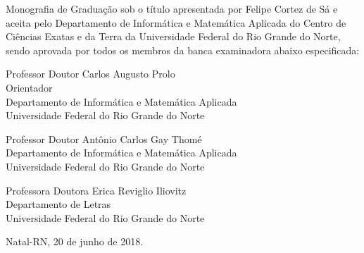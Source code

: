 \begin{folhadeaprovacao}
	\setlength{\ABNTsignthickness}{0.4pt}
	\setlength{\ABNTsignwidth}{10cm}
	
	\noindent 
	Monografia de Graduação sob o título \textit{\tccTitle} apresentada por 
	Felipe Cortez de Sá e aceita pelo Departamento de Informática e Matemática Aplicada do
	Centro de Ciências Exatas e da Terra da Universidade Federal do Rio Grande do Norte,
	sendo aprovada por todos os membros da banca examinadora abaixo especificada:
		
	\assinatura
	{
		Professor Doutor Carlos Augusto Prolo\\
		{\small Orientador} \\ 
		{\footnotesize
            Departamento de Informática e Matemática Aplicada\\
		  	Universidade Federal do Rio Grande do Norte
		}
	}
	
		
	\assinatura
	{
        Professor Doutor Antônio Carlos Gay Thomé\\ 
		{\footnotesize
            Departamento de Informática e Matemática Aplicada\\
		  	Universidade Federal do Rio Grande do Norte
		}
	}
		
	\assinatura
	{
		Professora Doutora Erica Reviglio Iliovitz \\ 
		{\footnotesize
            Departamento de Letras\\
		  	Universidade Federal do Rio Grande do Norte
		}
	}
		
	\vfill
	
	\begin{center}
		Natal-RN, 20 de junho de 2018.
	\end{center}
\end{folhadeaprovacao}
